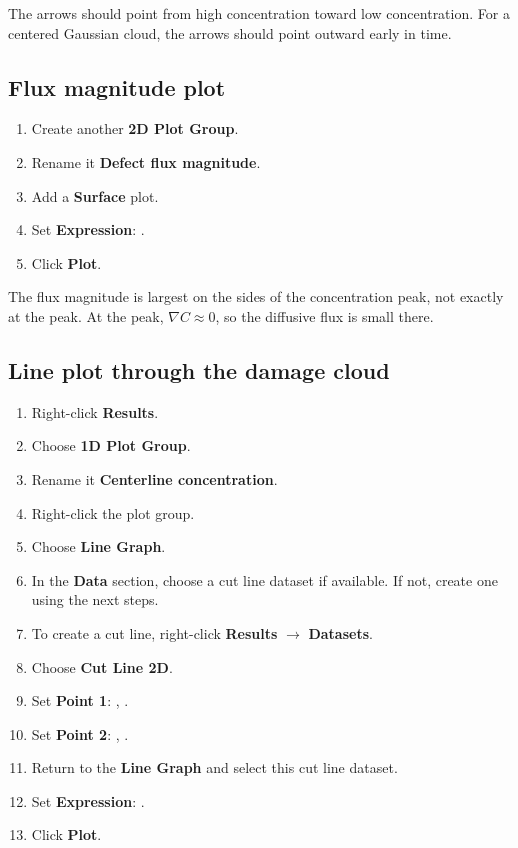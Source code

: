 \documentclass[11pt]{article}
\newcommand{\code}[1]{\texttt{\detokenize{#1}}}
\begin{document}
The arrows should point from high concentration toward low concentration. For a centered Gaussian cloud, the arrows should point outward early in time.

\subsection{Flux magnitude plot}

\begin{enumerate}[leftmargin=2em]
\item Create another \textbf{2D Plot Group}.
\item Rename it \textbf{Defect flux magnitude}.
\item Add a \textbf{Surface} plot.
\item Set \textbf{Expression}: \code{Jcmag}.
\item Click \textbf{Plot}.
\end{enumerate}

The flux magnitude is largest on the sides of the concentration peak, not exactly at the peak. At the peak, $\nabla C\approx 0$, so the diffusive flux is small there.

\subsection{Line plot through the damage cloud}

\begin{enumerate}[leftmargin=2em]
\item Right-click \textbf{Results}.
\item Choose \textbf{1D Plot Group}.
\item Rename it \textbf{Centerline concentration}.
\item Right-click the plot group.
\item Choose \textbf{Line Graph}.
\item In the \textbf{Data} section, choose a cut line dataset if available. If not, create one using the next steps.
\item To create a cut line, right-click \textbf{Results} $\rightarrow$ \textbf{Datasets}.
\item Choose \textbf{Cut Line 2D}.
\item Set \textbf{Point 1}: \code{0}, \code{y0}.
\item Set \textbf{Point 2}: \code{Lx}, \code{y0}.
\item Return to the \textbf{Line Graph} and select this cut line dataset.
\item Set \textbf{Expression}: \code{C}.
\item Click \textbf{Plot}.
\end{enumerate}
\end{document}
